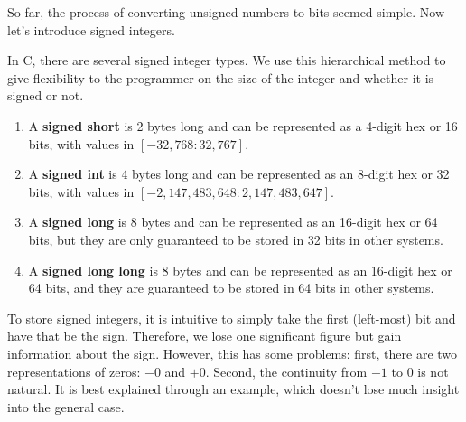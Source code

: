   So far, the process of converting unsigned numbers to bits seemed simple. Now let's introduce signed integers. 

  \begin{definition}
    In C, there are several signed integer types. We use this hierarchical method to give flexibility to the programmer on the size of the integer and whether it is signed or not. 
    \begin{enumerate} 
      \item A \textbf{signed short} is 2 bytes long and can be represented as a 4-digit hex or 16 bits, with values in $[-32,768: 32,767]$. 
      \item A \textbf{signed int} is 4 bytes long and can be represented as an 8-digit hex or 32 bits, with values in $[-2,147,483,648: 2,147,483,647]$. 
      \item A \textbf{signed long} is 8 bytes and can be represented as an 16-digit hex or 64 bits, but they are only guaranteed to be stored in 32 bits in other systems. 
      \item A \textbf{signed long long} is 8 bytes and can be represented as an 16-digit hex or 64 bits, and they are guaranteed to be stored in 64 bits in other systems. 
    \end{enumerate}
  \end{definition}

  To store signed integers, it is intuitive to simply take the first (left-most) bit and have that be the sign. Therefore, we lose one significant figure but gain information about the sign. However, this has some problems: first, there are two representations of zeros: $-0$ and $+0$. Second, the continuity from $-1$ to $0$ is not natural. It is best explained through an example, which doesn't lose much insight into the general case. 

